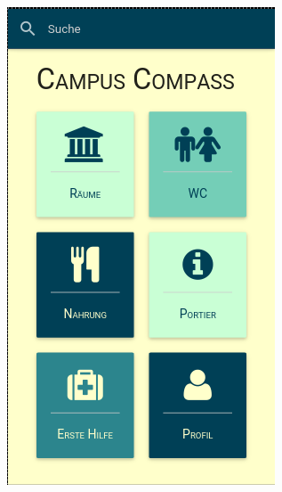 \begin{figure}[ht]
\begin{flushleft}
\begin{minipage}[b]{.5\textwidth}
  \includegraphics[width=.8\linewidth]{img/menu_final.png}
  \label{img:menu-final}
\end{minipage}
\end{flushleft}
\end{figure}

